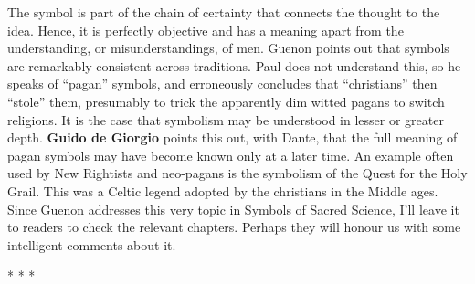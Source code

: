 The symbol is part of the chain of certainty that connects the thought to the idea. Hence, it is perfectly objective and has a meaning apart from the understanding, or misunderstandings, of men. Guenon points out that symbols are remarkably consistent across traditions. Paul does not understand this, so he speaks of ``pagan'' symbols, and erroneously concludes that ``christians'' then ``stole'' them, presumably to trick the apparently dim witted pagans to switch religions. It is the case that symbolism may be understood in lesser or greater depth. \textbf{Guido de Giorgio} points this out, with Dante, that the full meaning of pagan symbols may have become known only at a later time. An example often used by New Rightists and neo-pagans is the symbolism of the Quest for the Holy Grail. This was a Celtic legend adopted by the christians in the Middle ages. Since Guenon addresses this very topic in Symbols of Sacred Science, I'll leave it to readers to check the relevant chapters. Perhaps they will honour us with some intelligent comments about it.



\begin{center}* * *\end{center}

